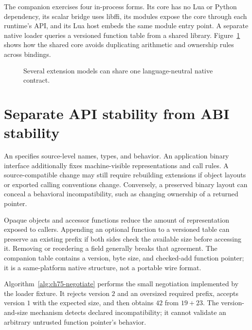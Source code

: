 The companion exercises four in-process forms.
Its core has no Lua or Python dependency, its scalar bridge uses libffi, its modules expose the core through each runtime's API, and its Lua host embeds the same module entry point.
A separate native loader queries a versioned function table from a shared library.
Figure~\ref{fig:ch75-models} shows how the shared core avoids duplicating arithmetic and ownership rules across bindings.

\begin{figure}[htbp]
\centering
{}
\caption{Several extension models can share one language-neutral native contract.}
\label{fig:ch75-models}
\end{figure}

\section{Separate API stability from ABI stability}
\label{sec:ch75-stability}
An  specifies source-level names, types, and behavior.
An application binary interface additionally fixes machine-visible representations and call rules.
A source-compatible change may still require rebuilding extensions if object layouts or exported calling conventions change.
Conversely, a preserved binary layout can conceal a behavioral incompatibility, such as changing ownership of a returned pointer.

Opaque objects and accessor functions reduce the amount of representation exposed to callers.
Appending an optional function to a versioned table can preserve an existing prefix if both sides check the available size before accessing it.
Removing or reordering a field generally breaks that agreement.
The companion table contains a version, byte size, and checked-add function pointer; it is a same-platform native structure, not a portable wire format.

Algorithm~\ref{alg:ch75-negotiate} performs the small negotiation implemented by the loader fixture.
It rejects version $2$ and an oversized required prefix, accepts version $1$ with the expected size, and then obtains $42$ from $19+23$.
The version-and-size mechanism detects declared incompatibility; it cannot validate an arbitrary untrusted function pointer's behavior.


